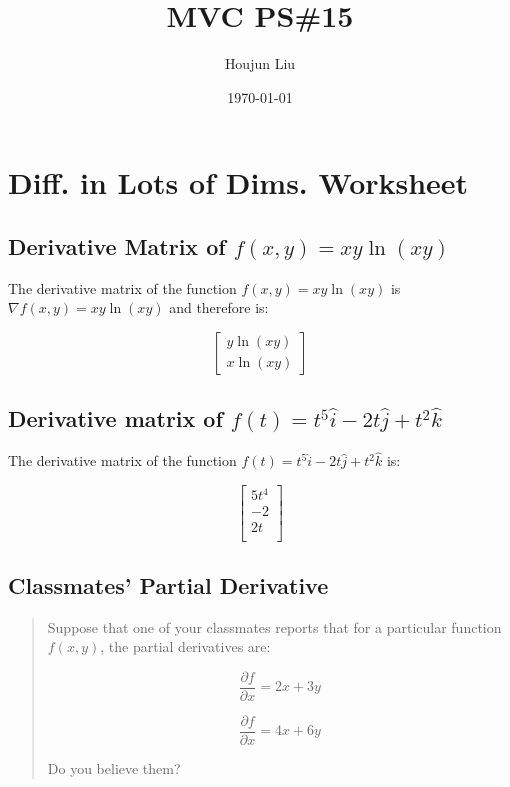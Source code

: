\documentclass[letterpaper]{article}
\author{Houjun Liu}
\date{\today}
\title{MVC PS\#15}
\renewcommand{\tableofcontents}{}
\begin{document}
\tableofcontents


\section{Diff. in Lots of Dims. Worksheet}
\label{sec:orgde24e60}
\subsection{Derivative Matrix of \(f(x,y) = xy\ln(xy)\)}
\label{sec:org138f1f6}
The derivative matrix of the function \(f(x,y) = xy\ln(xy)\) is \(\nabla f(x,y) = xy\ln(xy)\) and therefore is: 

\begin{equation}
\begin{bmatrix}
y \ln(xy) \\
x \ln(xy)
\end{bmatrix}
\end{equation}

\subsection{Derivative matrix of \(f(t) = t^5 \hat{i} - 2t \hat{j} + t^2 \hat{k}\)}
\label{sec:org1e30235}

The derivative matrix of the function \(f(t) = t^5 \hat{i} - 2t \hat{j} + t^2 \hat{k}\) is: 

\begin{equation}
\begin{bmatrix}    
5t^4 \\
-2 \\
2t \\
\end{bmatrix}    
\end{equation}


\subsection{Classmates' Partial Derivative}
\label{sec:orgaf7b151}
\begin{quote}
Suppose that one of your classmates reports that for a particular function \(f(x,y)\), the partial derivatives are:

\begin{equation}
    \frac{\partial f}{\partial x} = 2x+3y
\end{equation}

\begin{equation}
    \frac{\partial f}{\partial x} = 4x+6y
\end{equation}

Do you believe them?
\end{quote}
\end{document}
